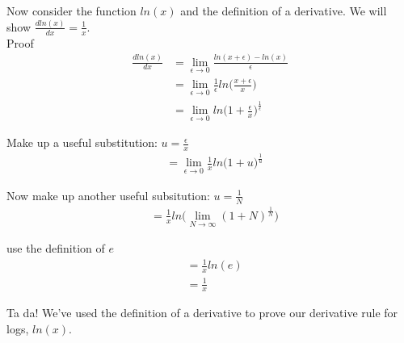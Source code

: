 \documentclass{article}
\begin{document}
Now consider the function $ln(x)$ and the definition of a derivative. We will show $\frac{d ln(x)}{dx} = \frac{1}{x}$.\\

Proof
\begin{align}
    \frac{dln(x)}{dx} &= \lim_{\epsilon \to 0} \frac{ln(x+\epsilon) - ln(x)}{\epsilon} \\
    &= \lim_{\epsilon \to 0} \frac{1}{\epsilon} ln\Bigg(\frac{x+\epsilon}{x} \Bigg) \\
    &= \lim_{\epsilon \to 0}  ln\Bigg(1+ \frac{\epsilon}{x} \Bigg)^{\frac{1}{\epsilon}}
\end{align}

Make up a useful substitution: $u = \frac{\epsilon}{x}$
\begin{align}
    &= \lim_{\epsilon \to 0} \frac{1}{x} ln\Bigg(1+ u \Bigg)^{\frac{1}{u}}
\end{align}

Now make up another useful subsitution: $u = \frac{1}{N}$
\begin{align}
    &= \frac{1}{x} ln\Bigg(\lim_{N \to \infty}  (1+ N)^{\frac{1}{N}}\Bigg)
\end{align}

use the definition of $e$ 
\begin{align}
    &= \frac{1}{x} ln(e)\\
    &= \frac{1}{x}
\end{align}

Ta da! We've used the definition of a derivative to prove our derivative rule for logs, $ln(x)$. 
\end{document}

